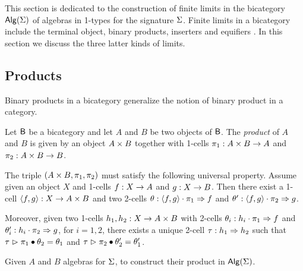 This section is dedicated to the construction of finite limits in the
bicategory $\mathsf{Alg}(\Sigma)$ of algebras in 1-types for the signature
$\Sigma$.  Finite limits in a bicategory include the terminal object,
binary products, inserters and equifiers
\cite{power1991characterization}. In this section we discuss the three
latter kinds of limits.

\subsection{Products}

Binary products in a bicategory generalize the notion of binary
product in a category.

\begin{definition}\label{def:product}
Let $\mathsf{B}$ be a bicategory and let $A$ and $B$ be two objects of
$\mathsf{B}$. The \emph{product} of $A$ and $B$ is given by an object $A \times B$ together with 1-cells $\pi_1 : A \times B \rightarrow A$ and
$\pi_2 : A \times B \rightarrow B$.

The triple $(A \times B,\pi_1, \pi_2)$ must satisfy the following
universal property. Assume given an object $X$ and 1-cells $f : X
\rightarrow A$ and $g : X \rightarrow B$. Then there exist a 1-cell
$\langle f , g \rangle : X \rightarrow A \times B$ and two 2-cells $\theta :
\langle f , g \rangle \cdot \pi_1 \Rightarrow f$ and $\theta' : \langle f , g \rangle
\cdot \pi_2 \Rightarrow g$.

Moreover, given two 1-cells $h_1,h_2 : X \rightarrow A \times B$ with
2-cells $\theta_i : h_i \cdot \pi_1 \Rightarrow f$ and $\theta'_i : h_i
\cdot \pi_2 \Rightarrow g$, for $i= 1,2$, there exists a unique
2-cell $\tau : h_1 \Rightarrow h_2$ such that $\tau \vartriangleright
\pi_1 \bullet \theta_2 = \theta_1$ and $\tau \vartriangleright \pi_2 \bullet
\theta'_2 = \theta'_1$.
\end{definition} 

\begin{problem}
\label{prob:product}
Given $A$ and $B$ algebras for $\Sigma$, to construct their product in
$\mathsf{Alg}(\Sigma)$.
\end{problem}

